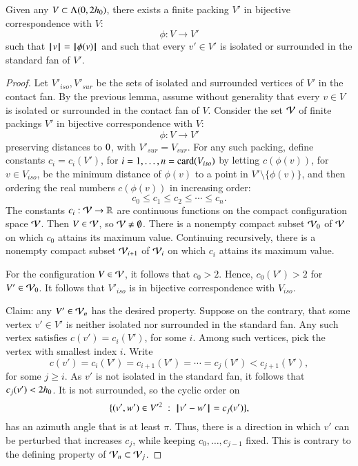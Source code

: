 {\begin{lemma}\label{lemma:surrounded}  
Given any $V\subset \Lambda(0,2{h_0})$,
there exists a finite packing $V'$ 
in bijective correspondence with $V$:
$$
\phi:V\to V'
$$
such that ${{\hskip0.1em|\hskip-0.15em|\hskip0.1em}v{\hskip0.1em|\hskip-0.15em|\hskip0.1em}} = {{\hskip0.1em|\hskip-0.15em|\hskip0.1em}\phi(v){\hskip0.1em|\hskip-0.15em|\hskip0.1em}}$ and
such that every $v'\in V'$
is isolated or surrounded in the standard fan of $V'$.
\end{lemma}

\begin{proof}  
Let $V'_{iso},V'_{sur}$ be the
sets of isolated and surrounded vertices of $V'$ in the contact
fan.
By the previous lemma,  assume
without generality that every $v\in V$ is isolated
or surrounded in the contact fan of $V$.    
Consider the set ${\mathcal V}$ of finite
packings $V'$ in bijective correspondence with $V$:
$$
\phi:V\to V'
$$
preserving distances to $0$, with $V'_{sur}=V_{sur}$.
For any such packing, define constants $c_i=c_i(V')$,
for $i=1,\ldots,n={\operatorname{card}}(V_{iso})$ by letting 
$c(\phi(v))$, for $v\in V_{iso}$, 
be the minimum distance of $\phi(v)$ to a point
in $V'\setminus \{\phi(v)\}$, and then ordering the real numbers $c(\phi(v))$ in increasing order:
$$
c_0 \le c_1 \le c_2 \le \cdots \le c_n.
$$
The constants $c_i:{\mathcal V}\to\mathbb{R}$ are continuous functions on the compact configuration space ${\mathcal V}$.
Then $V\in {\mathcal V}$, so ${\mathcal V}\ne\emptyset$.
There is a nonempty 
compact subset ${\mathcal V}_0$ of ${\mathcal V}$ on which
$c_0$ attains its maximum value. Continuing recursively,
there is a nonempty compact subset ${\mathcal V}_{i+1}$ of
${\mathcal V}_{i}$ on which $c_i$ attains its maximum value.

For the configuration $V\in {\mathcal V}$, it follows that $c_0 >2$.
Hence, $c_0(V')>2$ for $V'\in{\mathcal V}_0$.  It follows
that $V'_{iso}$ is in bijective correspondence with
$V_{iso}$.

Claim:  any $V'\in {\mathcal V}_n$ has the desired property.
Suppose on the contrary, that some vertex $v'\in V'$
is neither isolated nor surrounded in the standard fan.  
Any such vertex satisfies $c(v')=c_i(V')$, for some $i$.
Among such vertices, pick the vertex with smallest index
$i$.  Write 
$$
c(v') = c_i(V') = c_{i+1}(V') =\cdots= c_j(V') < c_{j+1}(V'),
$$
for some $j\ge i$.  As $v'$ is not isolated in the
standard fan, it follows that $c_j(v') < 2{h_0}$.  It is not surrounded,
so the cyclic order on
$$
\{(v',w')\in V'^2 \ :\  {\hskip0.1em|\hskip-0.15em|\hskip0.1em}v' - w'{\hskip0.1em|\hskip-0.15em|\hskip0.1em} = c_j(v')\},
$$
has an azimuth angle that is at least $\pi$.
Thus, there is a direction in which $v'$ can be perturbed
that increases $c_j$, while keeping $c_0,\ldots,c_{j-1}$
fixed.  This is contrary to the defining property of
${\mathcal V}_n\subset{\mathcal V}_j$.
\end{proof}


}
